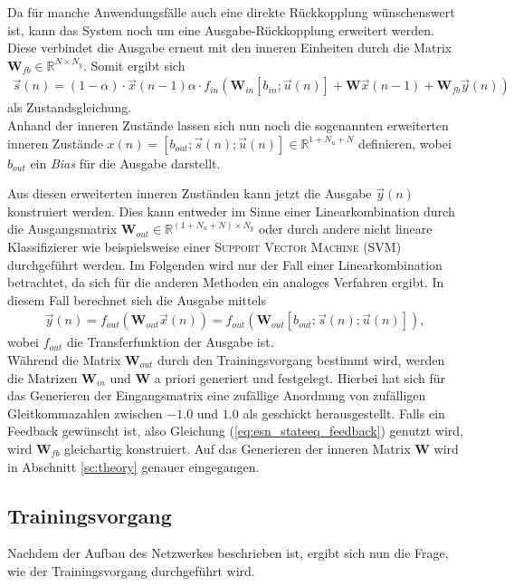 Da für manche Anwendungsfälle auch eine direkte Rückkopplung wünschenswert ist, kann das System noch um eine Ausgabe-Rückkopplung erweitert werden. Diese verbindet die Ausgabe erneut mit den inneren Einheiten durch die Matrix $\mathbf{W}_{fb} \in \mathbb{R}^{N \times N_y}$.
Somit ergibt sich 
\begin{align}
\label{eq:esn_stateeq_feedback}
\vec{s}(n) = (1 - \alpha) \cdot \vec{x}(n-1)  \alpha \cdot f_{in}\left( \mathbf{W}_{in} [b_{in}; \vec{u}(n)] + \mathbf{W} \vec{x}(n-1) + \mathbf{W}_{fb} \vec{y}(n) \right)
\end{align}
als Zustandsgleichung.\\

Anhand der inneren Zustände lassen sich nun noch die sogenannten erweiterten inneren Zustände $x(n) = [b_{out}; \vec{s}(n); \vec{u}(n)] \in \mathbb{R}^{1 + N_u + N}$ definieren, wobei $b_{out}$ ein \textit{Bias} für die Ausgabe darstellt. 

Aus diesen erweiterten inneren Zuständen kann jetzt die Ausgabe $\vec{y}(n)$ konstruiert werden. Dies kann entweder im Sinne einer Linearkombination durch die Ausgangsmatrix $\mathbf{W}_{out} \in \mathbb{R}^{(1 + N_u + N) \times N_y}$ oder durch andere nicht lineare Klassifizierer wie beispielsweise einer \textsc{Support Vector Machine (SVM)} durchgeführt werden. Im Folgenden wird nur der Fall einer Linearkombination betrachtet, da sich für die anderen Methoden ein analoges Verfahren ergibt.
In diesem Fall berechnet sich die Ausgabe mittels
\begin{align}
\vec{y}(n) = f_{out} \left( \mathbf{W}_{out} \vec{x}(n) \right) = f_{out} \left( \mathbf{W}_{out} [b_{out}; \vec{s}(n); \vec{u}(n)] \right),
\end{align}
wobei $f_{out}$ die Transferfunktion der Ausgabe ist.\\

Während die Matrix $\mathbf{W}_{out}$ durch den Trainingsvorgang bestimmt wird, werden die Matrizen $\mathbf{W}_{in}$ und $\mathbf{W}$ a priori generiert und festgelegt. Hierbei hat sich für das Generieren der Eingangsmatrix eine zufällige Anordnung von zufälligen Gleitkommazahlen zwischen $-1.0$ und $1.0$ als geschickt herausgestellt. Falls ein Feedback gewünscht ist, also Gleichung (\ref{eq:esn_stateeq_feedback}) genutzt wird, wird $\mathbf{W}_{fb}$ gleichartig konstruiert. Auf das Generieren der inneren Matrix $\mathbf{W}$ wird in Abschnitt \ref{sc:theory} genauer eingegangen.

\subsection{Trainingsvorgang}
Nachdem der Aufbau des Netzwerkes beschrieben ist, ergibt sich nun die Frage, wie der Trainingsvorgang durchgeführt wird.

